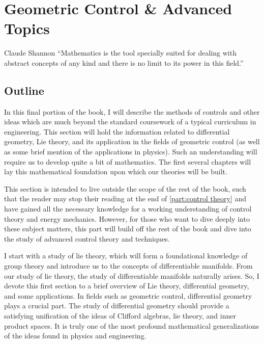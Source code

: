 \part{Geometric Control \& Advanced Topics}\label{part: advanced topics}
\begin{chapquote}{Claude Shannon}
    ``Mathematics is the tool specially suited for dealing with abstract concepts of any kind and there is no limit to its power in this field.''
\end{chapquote}

\newpage

\chapter*{Outline}

In this final portion of the book, I will describe the methods of controls and other ideas which are much beyond the standard coursework of a typical curriculum in engineering. This section will hold the information related to differential geometry, Lie theory, and its application in the fields of geometric control (as well as some brief mention of the applications in physics). Such an understanding will require us to develop quite a bit of mathematics. The first several chapters will lay this mathematical foundation upon which our theories will be built.

This section is intended to live outside the scope of the rest of the book, such that the reader may stop their reading at the end of \autoref{part:control theory} and have gained all the necessary knowledge for a working understanding of control theory and energy mechanics. However, for those who want to dive deeply into these subject matters, this part will build off the rest of the book and dive into the study of advanced control theory and techniques. 

I start with a study of \gls{lie theory}, which will form a foundational knowledge of group theory and introduce us to the concepts of differentiable manifolds. From our study of \gls{lie theory}, the study of differentiable manifolds naturally arises. So, I devote this first section to a brief overview of Lie theory, differential geometry, and some applications. In fields such as geometric control, differential geometry plays a crucial part. The study of differential geometry should provide a satisfying unification of the ideas of Clifford algebras, \gls{lie theory}, and inner product spaces. It is truly one of the most profound mathematical generalizations of the ideas found in physics and engineering.

